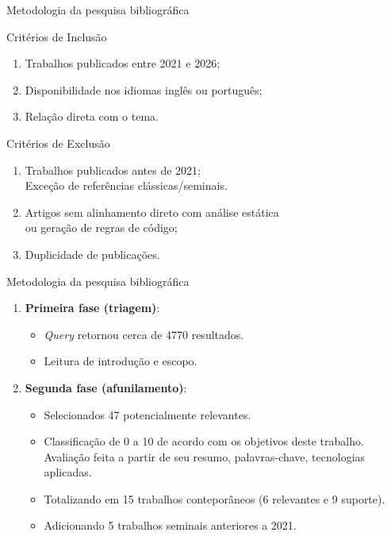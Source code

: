 \documentclass[
    aspectratio=169,   %
    12pt,
    brazil
]{beamer}
\newcommand{\minhaspaginas}{}
\begin{document}
\renewcommand{\minhaspaginas}{\small 15 - 16}
\begin{frame}{Metodologia da pesquisa bibliográfica}
  \begin{block}{Critérios de Inclusão}
    \begin{enumerate}
      \item Trabalhos publicados entre 2021 e 2026;
      \item Disponibilidade nos idiomas inglês ou português;
      \item Relação direta com o tema.
    \end{enumerate}
  \end{block}
  \begin{block}{Critérios de Exclusão}
    \begin{enumerate}
      \item Trabalhos publicados antes de 2021; \\
        \hspace{0.2cm} {\small Exceção de referências clássicas/seminais.}
      \item Artigos sem alinhamento direto com análise estática \\
        ou geração de regras de código;
      \item Duplicidade de publicações.
    \end{enumerate}
  \end{block}
\end{frame}

\renewcommand{\minhaspaginas}{\small 16}
\begin{frame}{Metodologia da pesquisa bibliográfica}
  \begin{enumerate}
    \item \textbf{Primeira fase (triagem)}: 
      \begin{itemize}
        \item \textit{Query} retornou cerca de 4770 resultados.
        \item Leitura de introdução e escopo.
      \end{itemize}
    \item \textbf{Segunda fase (afunilamento)}:
      \begin{itemize}
        \item Selecionados 47 potencialmente relevantes.
        \item Classificação de 0 a 10 de acordo com os objetivos deste trabalho. \\
        \hspace{0.2cm} {\small Avaliação feita a partir de seu resumo, palavras-chave, tecnologias aplicadas}.
      \item Totalizando em 15 trabalhos conteporâneos (6 relevantes e 9 suporte).
      \item Adicionando 5 trabalhos seminais anteriores a 2021.
      \end{itemize}
  \end{enumerate}
\end{frame}
\end{document}
